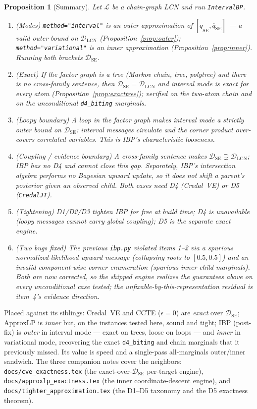 \documentclass[11pt]{article}
\newtheorem{proposition}{Proposition}
\newcommand{\lo}{\underline}
\newcommand{\hi}{\overline}
\newcommand{\DSE}{\mathcal{D}_{\mathrm{SE}}}
\newcommand{\DLCN}{\mathcal{D}_{\mathrm{LCN}}}
\newcommand{\IBP}{\texttt{IntervalBP}}
\begin{document}
\begin{proposition}[Summary]\label{prop:verdict}
Let $\mathcal L$ be a chain-graph LCN and run \IBP{}.
\begin{enumerate}
  \item (\emph{Modes}) \texttt{method="interval"} is an \emph{outer} approximation of $[\lo
    q_{\mathrm{SE}},\hi q_{\mathrm{SE}}]$ --- a valid outer bound on $\DLCN$
    (Proposition~\ref{prop:outer}); \texttt{method="variational"} is an \emph{inner} approximation
    (Proposition~\ref{prop:inner}). Running both brackets $\DSE$.
  \item (\emph{Exact}) If the factor graph is a tree (Markov chain, tree, polytree) and there is no
    cross-family sentence, then $\DSE=\DLCN$ and interval mode is exact for every atom
    (Proposition~\ref{prop:exacttree}); verified on the two-atom chain and on the unconditional
    \texttt{d4\_biting} marginals.
  \item (\emph{Loopy boundary}) A loop in the factor graph makes interval mode a \emph{strictly
    outer} bound on $\DSE$: interval messages circulate and the corner product over-covers correlated
    variables. This is IBP's characteristic looseness.
  \item (\emph{Coupling / evidence boundary}) A cross-family sentence makes $\DSE\supsetneq\DLCN$;
    IBP has no D4 and cannot close this gap. Separately, IBP's intersection algebra performs no
    Bayesian \emph{upward} update, so it does not shift a parent's posterior given an observed child.
    Both cases need D4 (Credal~VE) or D5 (\texttt{CredalJT}).
  \item (\emph{Tightening}) D1/D2/D3 tighten IBP for free at build time; D4 is unavailable (loopy
    messages cannot carry global coupling); D5 is the separate exact engine.
  \item (\emph{Two bugs fixed}) The previous \texttt{ibp.py} violated items 1--2 via a spurious
    normalized-likelihood upward message (collapsing roots to $[0.5,0.5]$) and an invalid
    component-wise corner enumeration (spurious inner child marginals). Both are now corrected, so
    the shipped engine realizes the guarantees above on every unconditional case tested; the
    unfixable-by-this-representation residual is item~4's evidence direction.
\end{enumerate}
\end{proposition}

\noindent Placed against its siblings: Credal~VE and CCTE ($\epsilon=0$) are \emph{exact} over
$\DSE$; ApproxLP is \emph{inner} but, on the instances tested here, sound and tight; IBP (post-fix)
is \emph{outer} in interval mode --- exact on trees, loose on loops --- and \emph{inner} in
variational mode, recovering the exact \texttt{d4\_biting} and chain marginals that it previously
missed. Its value is speed and a single-pass all-marginals outer/inner sandwich. The three companion
notes cover the neighbors:
\texttt{docs/cve\_exactness.tex} (the exact-over-$\DSE$ per-target engine),
\texttt{docs/approxlp\_exactness.tex} (the inner coordinate-descent engine), and
\texttt{docs/tighter\_approximation.tex} (the D1--D5 taxonomy and the D5 exactness theorem).
\end{document}
